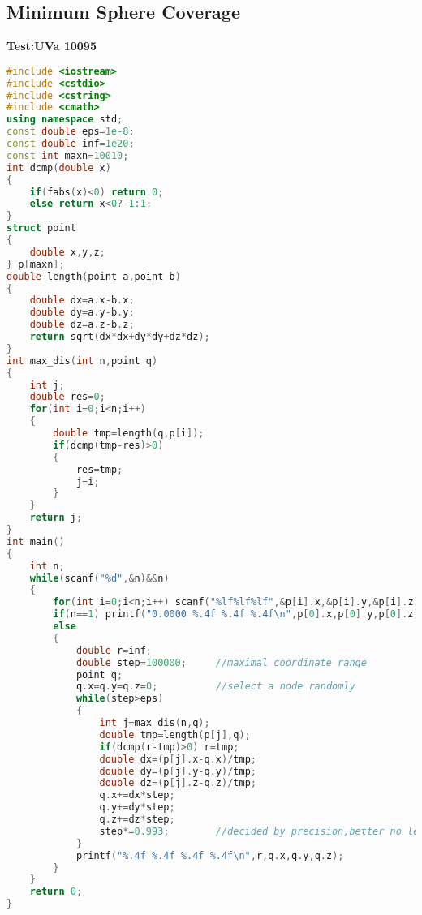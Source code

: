    \subsection{Minimum Sphere Coverage}
   \textbf{Test:UVa 10095}
   \begin{lstlisting}[language=C++]
#include <iostream>
#include <cstdio>
#include <cstring>
#include <cmath>
using namespace std;
const double eps=1e-8;
const double inf=1e20;
const int maxn=10010;
int dcmp(double x)
{
    if(fabs(x)<0) return 0;
    else return x<0?-1:1;
}
struct point
{
    double x,y,z;
} p[maxn];
double length(point a,point b)
{
    double dx=a.x-b.x;
    double dy=a.y-b.y;
    double dz=a.z-b.z;
    return sqrt(dx*dx+dy*dy+dz*dz);
}
int max_dis(int n,point q)
{
    int j;
    double res=0;
    for(int i=0;i<n;i++)
    {
        double tmp=length(q,p[i]);
        if(dcmp(tmp-res)>0)
        {
            res=tmp;
            j=i;
        }
    }
    return j;
}
int main()
{
    int n;
    while(scanf("%d",&n)&&n)
    {
        for(int i=0;i<n;i++) scanf("%lf%lf%lf",&p[i].x,&p[i].y,&p[i].z);
        if(n==1) printf("0.0000 %.4f %.4f %.4f\n",p[0].x,p[0].y,p[0].z);
        else
        {
            double r=inf;
            double step=100000;     //maximal coordinate range
            point q;
            q.x=q.y=q.z=0;          //select a node randomly
            while(step>eps)
            {
                int j=max_dis(n,q);
                double tmp=length(p[j],q);
                if(dcmp(r-tmp)>0) r=tmp;
                double dx=(p[j].x-q.x)/tmp;
                double dy=(p[j].y-q.y)/tmp;
                double dz=(p[j].z-q.z)/tmp;
                q.x+=dx*step;
                q.y+=dy*step;
                q.z+=dz*step;
                step*=0.993;        //decided by precision,better no less than 0.99
            }
            printf("%.4f %.4f %.4f %.4f\n",r,q.x,q.y,q.z);
        }
    }
    return 0;
}
   \end{lstlisting}





\endinput